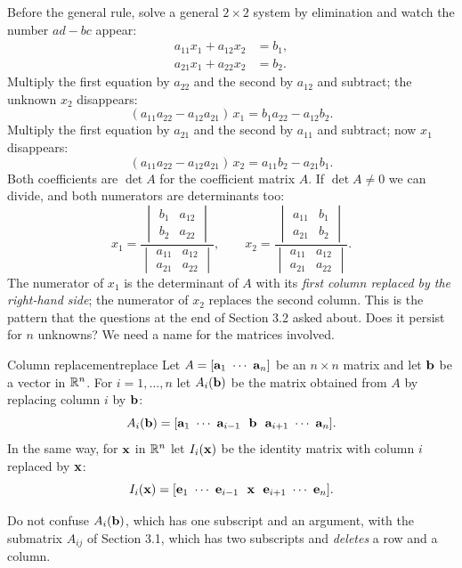 \documentclass[11pt]{article}
\begin{document}
Before the general rule, solve a general $2\times2$ system by elimination and watch the number $ad-bc$ appear:
\begin{align*}
a_{11}x_1+a_{12}x_2&=b_1,\\
a_{21}x_1+a_{22}x_2&=b_2.
\end{align*}
Multiply the first equation by $a_{22}$ and the second by $a_{12}$ and subtract; the unknown $x_2$ disappears:
\[
(a_{11}a_{22}-a_{12}a_{21})\,x_1=b_1a_{22}-a_{12}b_2 .
\]
Multiply the first equation by $a_{21}$ and the second by $a_{11}$ and subtract; now $x_1$ disappears:
\[
(a_{11}a_{22}-a_{12}a_{21})\,x_2=a_{11}b_2-a_{21}b_1 .
\]
Both coefficients are $\det A$ for the coefficient matrix $A$. If $\det A\neq0$ we can divide, and both numerators are determinants too:
\[
x_1=\frac{\begin{vmatrix}b_1&a_{12}\\b_2&a_{22}\end{vmatrix}}{\begin{vmatrix}a_{11}&a_{12}\\a_{21}&a_{22}\end{vmatrix}},\qquad
x_2=\frac{\begin{vmatrix}a_{11}&b_1\\a_{21}&b_2\end{vmatrix}}{\begin{vmatrix}a_{11}&a_{12}\\a_{21}&a_{22}\end{vmatrix}}.
\]
The numerator of $x_1$ is the determinant of $A$ with its \emph{first column replaced by the right-hand side}; the numerator of $x_2$ replaces the second column. This is the pattern that the questions at the end of Section 3.2 asked about. Does it persist for $n$ unknowns? We need a name for the matrices involved.

\begin{defn}{Column replacement}{replace}
Let $A=[\mathbf{a}_1\ \cdots\ \mathbf{a}_n]$ be an $n\times n$ matrix and let $\mathbf{b}$ be a vector in $\mathbb{R}^n$. For $i=1,\dots,n$ let $A_i(\mathbf{b})$ be the matrix obtained from $A$ by replacing column $i$ by $\mathbf{b}$:
\[
A_i(\bv{b})=[\bv{a}_1\ \cdots\ \bv{a}_{i-1}\ \ \bv{b}\ \ \bv{a}_{i+1}\ \cdots\ \bv{a}_n].
\]
In the same way, for $\mathbf{x}$ in $\mathbb{R}^n$ let $I_i(\mathbf{x})$ be the identity matrix with column $i$ replaced by $\mathbf{x}$:
\[
I_i(\bv{x})=[\bv{e}_1\ \cdots\ \bv{e}_{i-1}\ \ \bv{x}\ \ \bv{e}_{i+1}\ \cdots\ \bv{e}_n].
\]
\end{defn}

Do not confuse $A_i(\mathbf{b})$, which has one subscript and an argument, with the submatrix $A_{ij}$ of Section 3.1, which has two subscripts and \emph{deletes} a row and a column.
\end{document}
